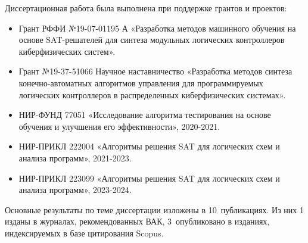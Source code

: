 Диссертационная работа была выполнена при поддержке грантов и проектов:
\begin{itemize}[beginpenalty=10000]
    \item Грант РФФИ №19-07-01195 А «Разработка методов машинного
    обучения на основе SAT-решателей для синтеза модульных логических контроллеров киберфизических систем».
    \item Грант №19-37-51066 Научное наставничество «Разработка методов синтеза конечно-автоматных алгоритмов управления для программируемых логических контроллеров в распределенных киберфизических системах».
    \item НИР-ФУНД 77051 «Исследование алгоритма тестирования на основе обучения и улучшения его эффективности», 2020-2021.
    \item НИР-ПРИКЛ 222004 «Алгоритмы решения SAT для логических схем и анализа программ», 2021-2023.
    \item НИР-ПРИКЛ 223099 «Алгоритмы решения SAT для логических схем и анализа программ», 2023-2024.
\end{itemize}


\publications
%
%
Основные результаты по теме диссертации изложены в 10~публикациях.
Из них 1 изданы в журналах, рекомендованных ВАК,
3~опубликовано в изданиях, индексируемых в базе цитирования Scopus.





